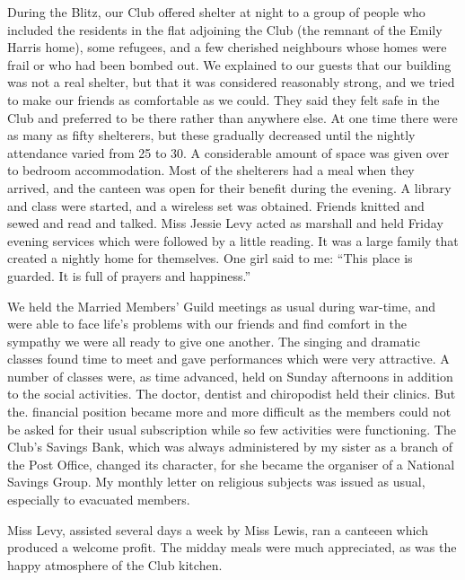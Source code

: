 During the Blitz, our Club offered shelter at night to
a group of people who included the residents in the flat
adjoining the Club (the remnant of the Emily Harris
home), some refugees, and a few cherished neighbours
whose homes were frail or who had been bombed out. We
explained to our guests that our building was not a real
shelter, but that it was considered reasonably strong, and
we tried to make our friends as comfortable as we could.
They said they felt safe in the Club and preferred to be
there rather than anywhere else. At one time there were
as many as fifty shelterers, but these gradually decreased
until the nightly attendance varied from 25 to 30. A considerable
amount of space was given over to bedroom
accommodation. Most of the shelterers had a meal when
they arrived, and the canteen was open for their benefit
during the evening. A library and class were started, and
a wireless set was obtained. Friends knitted and sewed
and read and talked. Miss Jessie Levy acted as marshall
and held Friday evening services which were followed by
a little reading. It was a large family that created a
nightly home for themselves. One girl said to me: “This
place is guarded. It is full of prayers and happiness.”

We held the Married Members’ Guild meetings as
usual during war-time, and were able to face life’s problems
with our friends and find comfort in the sympathy
we were all ready to give one another. The singing and
dramatic classes found time to meet and gave performances
which were very attractive. A number of classes
were, as time advanced, held on Sunday afternoons in
addition to the social activities. The doctor, dentist and
chiropodist held their clinics. But the. financial position
became more and more difficult as the members could
not be asked for their usual subscription while so few
activities were functioning. The Club’s Savings Bank,
which was always administered by my sister as a branch
of the Post Office, changed its character, for she became
the organiser of a National Savings Group. My monthly
letter on religious subjects was issued as usual, especially
to evacuated members.

Miss Levy, assisted several days a week by Miss Lewis,
ran a canteeen which produced a welcome profit. The
midday meals were much appreciated, as was the happy
atmosphere of the Club kitchen.

